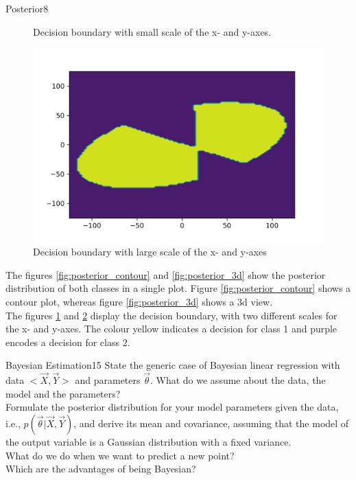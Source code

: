 \begin{questions}
\begin{question}{Posterior}{8}
\begin{figure}[]
	\centering
	\caption{Decision boundary with small scale of the x- and y-axes.}
	\label{fig:decision_small}
\end{figure}
\begin{figure}[]
	\includegraphics[width=0.8\linewidth]{pictures/decision_large.png}
	\centering
	\caption{Decision boundary with large scale of the x- and y-axes}
	\label{fig:decision_large}
\end{figure}
\begin{answer}
The figures \ref{fig:posterior_contour} and \ref{fig:posterior_3d} show the posterior distribution of both classes in a single plot. Figure \ref{fig:posterior_contour} shows a contour plot, whereas figure \ref{fig:posterior_3d} shows a 3d view.\\
The figures \ref{fig:decision_small} and \ref{fig:decision_large} display the decision boundary, with two different scales for the x- and y-axes. The colour yellow indicates a decision for class 1 and purple encodes a decision for class 2.
\end{answer}

\end{question}
\newpage

\begin{question}[bonus]{Bayesian Estimation}{15}
State the generic case of Bayesian linear regression with data $<\vec X, \vec Y>$ and parameters $\vec \theta$. What do we assume about the data, the model and the parameters?\\
Formulate the posterior distribution for your model parameters given the data, i.e., $p(\vec \theta | \vec X, \vec Y)$, and derive its mean and covariance, assuming that the model of the output variable is a Gaussian distribution with a fixed variance.\\
What do we do when we want to predict a new point?\\
Which are the advantages of being Bayesian? 


\end{question}
\end{questions}
